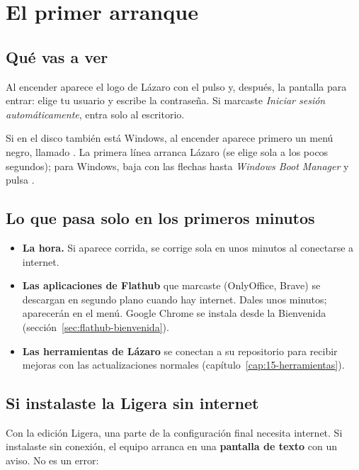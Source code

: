 \chapter{El primer arranque}\label{cap:05-primer-arranque}

\section{Qué vas a ver}

Al encender aparece el logo de Lázaro con el pulso y, después, la pantalla
para entrar: elige tu usuario y escribe la contraseña. Si marcaste
\emph{Iniciar sesión automáticamente}, entra solo al escritorio.

\begin{nota}
Si en el disco también está Windows, al encender aparece primero un menú
negro, llamado . La primera línea arranca Lázaro (se elige sola
a los pocos segundos); para Windows, baja con las flechas hasta
\emph{Windows Boot Manager} y pulsa .
\end{nota}

\section{Lo que pasa solo en los primeros minutos}

\begin{itemize}
  \item \textbf{La hora.} Si aparece corrida, se corrige sola en unos minutos
        al conectarse a internet.
  \item \textbf{Las aplicaciones de Flathub} que marcaste (OnlyOffice,
        Brave) se descargan en segundo plano cuando hay internet.
        Dales unos minutos; aparecerán en el menú. Google Chrome se
        instala desde la Bienvenida (sección~\ref{sec:flathub-bienvenida}).
  \item \textbf{Las herramientas de Lázaro} se conectan a su repositorio para
        recibir mejoras con las actualizaciones normales
        (capítulo~\ref{cap:15-herramientas}).
\end{itemize}

\section{Si instalaste la Ligera sin internet}\label{sec:primer-arranque-texto}

Con la edición Ligera, una parte de la configuración final necesita
internet. Si instalaste sin conexión, el equipo arranca en una
\textbf{pantalla de texto} con un aviso. No es un error:

